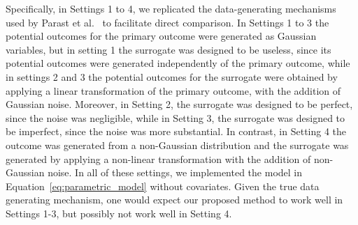 \documentclass[12pt]{article}
\begin{document}
Specifically, in Settings 1 to 4, we replicated the data-generating mechanisms used by Parast et al.\ \citep{parast2024rank} to facilitate direct comparison. In Settings 1 to 3 the potential outcomes for the primary outcome were generated as Gaussian variables, but in setting 1 the surrogate was designed to be useless, since its potential outcomes were generated independently of the primary outcome, while in settings 2 and 3 the potential outcomes for the surrogate were obtained by applying a linear transformation of the primary outcome, with the addition of Gaussian noise. Moreover, in Setting 2, the surrogate was designed to be perfect, since the noise was negligible, while in Setting 3, the surrogate was designed to be imperfect, since the noise was more substantial. In contrast, in Setting 4 the outcome was generated from a non-Gaussian distribution and the surrogate was generated by applying a non-linear transformation with the addition of non-Gaussian noise. In all of these settings, we implemented the model in Equation~\eqref{eq:parametric_model} without covariates. Given the true data generating mechanism, one would expect our proposed method to work well in Settings 1-3, but possibly not work well in Setting 4.
\end{document}

